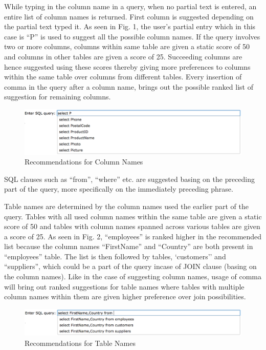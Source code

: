 \documentclass{acm_proc_article-sp}
\begin{document}
While typing in the column name in a query, when no partial text is entered, an entire list of column names is returned. First column is suggested depending on the partial text typed it. As seen in Fig. 1, the user's partial entry which in this case is ``P'' is used to suggest all the possible column names.  If the query involves two or more columns, columns within same table are given a static score of 50 and columns in other tables are given a score of 25. Succeeding columns are hence suggested using these scores thereby giving more preferences to columns within the same table over columns from different tables. Every insertion of comma in the query after a column name, brings out the possible ranked list of suggestion for remaining columns.

\begin{figure}
\centering
\includegraphics[width=170mm]{column_names}
\caption{Recommendations for Column Names}
\label{overflow}
\end{figure}

SQL clauses such as ``from'', ``where'' etc. are suggested basing on the preceding part of the query, more specifically on the immediately preceding phrase.

Table names are determined by the column names used the earlier part of the query. Tables with all used column names within the same table are given a static score of 50 and tables with column names spanned across various tables are given a score of 25. As seen in Fig. 2, ``employees'' is ranked higher in the recommended list because the column names ``FirstName'' and ``Country'' are both present in ``employees'' table. The list is then followed by tables, `customers'' and ``suppliers'', which could be a part of the query incase of JOIN clause (basing on the column names). Like in the case of suggesting column names, usage of comma will bring out ranked suggestions for table names where tables with multiple column names within them are given higher preference over join possibilities.


\begin{figure}
\centering
\includegraphics[width=170mm]{table_names.png}
\caption{Recommendations for Table Names}
\label{overflow}
\end{figure}
\end{document}

